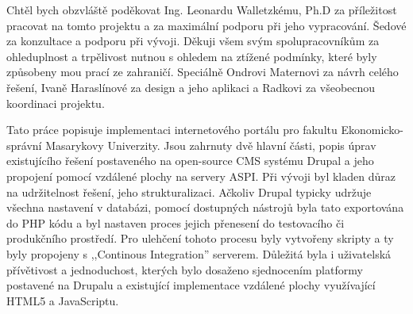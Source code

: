 \documentclass[10pt,final,oneside]{fithesis2}
\begin{document}
\FrontMatter
\ThesisTitlePage


\begin{ThesisDeclaration}
  \DeclarationText
  \AdvisorName
\end{ThesisDeclaration}



\begin{ThesisThanks}
Chtěl bych obzvláště poděkovat Ing. Leonardu Walletzkému, Ph.D za příležitost pracovat na tomto projektu a za maximální podporu při jeho vypracování. %
Šedové za konzultace a podporu při vývoji. Děkuji všem svým spolupracovníkům za ohleduplnost a trpělivost nutnou s ohledem na ztížené podmínky, které byly způsobeny mou prací ze zahraničí. Speciálně Ondrovi Maternovi za návrh celého řešení, Ivaně Haraslínové za design a jeho aplikaci a Radkovi %
za všeobecnou koordinaci projektu.
\end{ThesisThanks}

\begin{ThesisAbstract}
Tato práce popisuje implementaci internetového portálu pro fakultu Ekonomicko-správní Masarykovy Univerzity. Jsou zahrnuty dvě hlavní části, popis úprav existujícího řešení postaveného na open-source CMS systému Drupal a jeho propojení pomocí vzdálené plochy na servery ASPI. Při vývoji byl kladen důraz na udržitelnost řešení, jeho strukturalizaci. Ačkoliv Drupal typicky udržuje všechna nastavení v databázi, pomocí dostupných nástrojů byla tato exportována do PHP kódu a byl nastaven proces jejich přenesení do testovacího či produkčního prostředí. Pro ulehčení tohoto procesu byly vytvořeny skripty a ty byly propojeny s ,,Continous Integration'' serverem. Důležitá byla i uživatelská přívětivost a jednoduchost, kterých bylo dosaženo sjednocením platformy postavené na Drupalu a existující implementace vzdálené plochy využívající HTML5 a JavaScriptu.
\end{ThesisAbstract}
\end{document}
